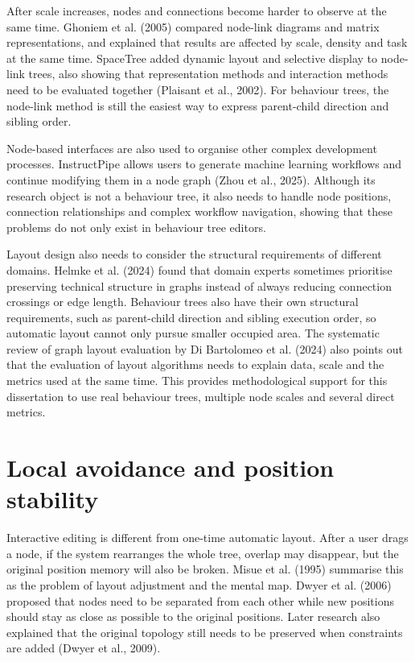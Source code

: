 \documentclass[11pt,a4paper,oneside,extrafontsizes]{memoir}
\begin{document}
After scale increases, nodes and connections become harder to observe at the same time. Ghoniem et al. (2005) compared node-link diagrams and matrix representations, and explained that results are affected by scale, density and task at the same time. SpaceTree added dynamic layout and selective display to node-link trees, also showing that representation methods and interaction methods need to be evaluated together (Plaisant et al., 2002). For behaviour trees, the node-link method is still the easiest way to express parent-child direction and sibling order.

Node-based interfaces are also used to organise other complex development processes. InstructPipe allows users to generate machine learning workflows and continue modifying them in a node graph (Zhou et al., 2025). Although its research object is not a behaviour tree, it also needs to handle node positions, connection relationships and complex workflow navigation, showing that these problems do not only exist in behaviour tree editors.

Layout design also needs to consider the structural requirements of different domains. Helmke et al. (2024) found that domain experts sometimes prioritise preserving technical structure in graphs instead of always reducing connection crossings or edge length. Behaviour trees also have their own structural requirements, such as parent-child direction and sibling execution order, so automatic layout cannot only pursue smaller occupied area. The systematic review of graph layout evaluation by Di Bartolomeo et al. (2024) also points out that the evaluation of layout algorithms needs to explain data, scale and the metrics used at the same time. This provides methodological support for this dissertation to use real behaviour trees, multiple node scales and several direct metrics.

\section{Local avoidance and position stability}

Interactive editing is different from one-time automatic layout. After a user drags a node, if the system rearranges the whole tree, overlap may disappear, but the original position memory will also be broken. Misue et al. (1995) summarise this as the problem of layout adjustment and the mental map. Dwyer et al. (2006) proposed that nodes need to be separated from each other while new positions should stay as close as possible to the original positions. Later research also explained that the original topology still needs to be preserved when constraints are added (Dwyer et al., 2009).
\end{document}
